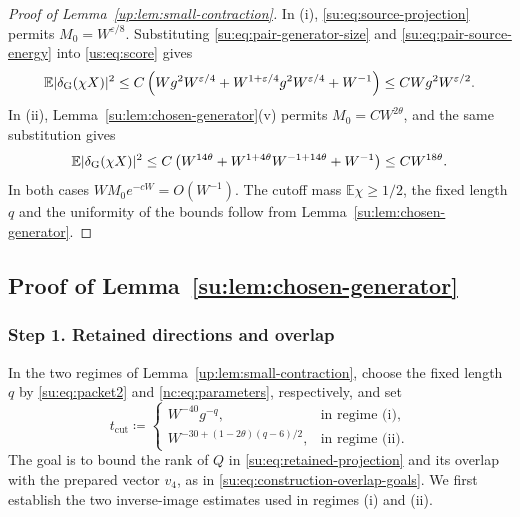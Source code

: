 \documentclass[11pt]{article}
\numberwithin{equation}{section}
\theoremstyle{remark}
\newcommand{\E}{\mathbb E}
\begin{document}
\begin{proof}[Proof of Lemma~\ref{up:lem:small-contraction}]
In (i), \eqref{su:eq:source-projection} permits $M_0=W^{\varepsilon/8}$.
Substituting \eqref{su:eq:pair-generator-size} and
\eqref{su:eq:pair-source-energy} into \eqref{us:eq:score} gives
\begin{equation}\label{su:eq:local}
 \E|\delta_{\rm G}(\chi X)|^2
 \le C\left(Wg^2W^{\varepsilon/4}
           +W^{1+\varepsilon/4}g^2W^{\varepsilon/4}+W^{-1}\right)
 \le CWg^2W^{\varepsilon/2}.
\end{equation}
In (ii), Lemma~\ref{su:lem:chosen-generator}(v) permits $M_0=CW^{2\theta}$,
and the same substitution gives
\begin{equation}\label{nc:eq:finalscore}
 \E|\delta_{\rm G}(\chi X)|^2
 \le C\left(W^{14\theta}+W^{1+4\theta}W^{-1+14\theta}+W^{-1}\right)
 \le CW^{18\theta}.
\end{equation}
In both cases $WM_0e^{-cW}=O(W^{-1})$. The cutoff mass
$\E\chi\ge1/2$, the fixed length $q$ and the uniformity of the bounds
follow from Lemma~\ref{su:lem:chosen-generator}.
\end{proof}

\subsection{Proof of Lemma~\ref*{su:lem:chosen-generator}}
\label{su:sec:construction-estimates}
\label{sec:critical-upper-proof}

\subsubsection{Step 1. Retained directions and overlap}
\label{su:sec:retained-geometry}
\label{su:sec:range-proof}
\label{su:sec:packet}
\label{su:sec:range}
\label{su:sec:field}

In the two regimes of Lemma~\ref{up:lem:small-contraction}, choose the
fixed length $q$ by \eqref{su:eq:packet2} and \eqref{nc:eq:parameters},
respectively, and set
\begin{equation}\label{su:eq:construction-threshold}
 t_{\mathrm{cut}}\coloneqq
 \begin{cases}
 W^{-40}g^{-q},&\text{in regime (i)},\\
 W^{-30+(1-2\theta)(q-6)/2},&\text{in regime (ii)}.
 \end{cases}
\end{equation}
The goal is to bound the rank of $Q$ in \eqref{su:eq:retained-projection}
and its overlap with the prepared vector $v_4$, as in
\eqref{su:eq:construction-overlap-goals}. We first establish the two
inverse-image estimates used in regimes (i) and (ii).
\end{document}
